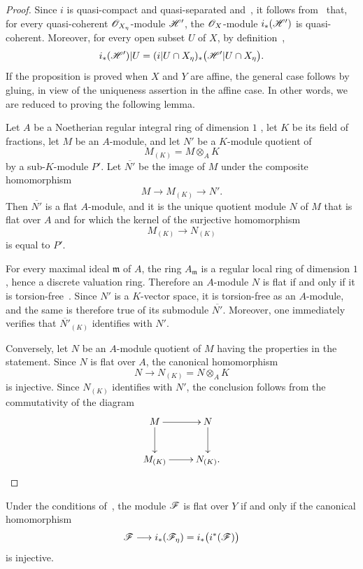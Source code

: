 \begin{proof}
Since $i$ is quasi-compact and quasi-separated
 and~, it follows
from~ that, for every quasi-coherent
$\mathscr{O}_{X_\eta}$-module $\mathscr{H}'$, the $\mathscr{O}_X$-module
$i_*(\mathscr{H}')$ is quasi-coherent. Moreover, for every open subset
$U$ of $X$, by definition~,
\[
  i_*(\mathscr{H}')|U
    =
  (i|U\cap X_\eta)_*
    \bigl(\mathscr{H}'|U\cap X_\eta\bigr).
\]
If the proposition is proved when $X$ and $Y$ are affine, the general
case follows by gluing, in view of the uniqueness assertion in the
affine case. In other words, we are reduced to proving the following
lemma.

\begin{lemma}[2.8.1.1]
\label{IV.2.8.1.1}
Let $A$ be a Noetherian regular integral ring of dimension $1$
, let $K$ be its field of fractions, let $M$ be an
$A$-module, and let $N'$ be a $K$-module quotient of
\[
  M_{(K)}=M\otimes_A K
\]
by a sub-$K$-module $P'$. Let $\overline{N'}$ be the image of $M$
under the composite homomorphism
\[
  M\longrightarrow M_{(K)}\longrightarrow N'.
\]
Then $\overline{N'}$ is a flat $A$-module, and it is the unique
quotient module $N$ of $M$ that is flat over $A$ and for which the
kernel of the surjective homomorphism
\[
  M_{(K)}\longrightarrow N_{(K)}
\]
is equal to $P'$.
\end{lemma}

For every maximal ideal $\mathfrak{m}$ of $A$, the ring
$A_\mathfrak{m}$ is a regular local ring of dimension $1$, hence a
discrete valuation ring. Therefore an $A$-module $N$ is flat if and
only if it is torsion-free~. Since $N'$ is a
$K$-vector space, it is torsion-free as an $A$-module, and the same is
therefore true of its submodule $\overline{N'}$. Moreover, one
immediately verifies that $\overline{N'}_{(K)}$ identifies with $N'$.

Conversely, let $N$ be an $A$-module quotient of $M$ having the
properties in the statement. Since $N$ is flat over $A$, the
canonical homomorphism
\[
  N\longrightarrow N_{(K)}=N\otimes_A K
\]
is injective. Since $N_{(K)}$ identifies with $N'$, the conclusion
follows from the commutativity of the diagram
\[
\xymatrix{
  M \ar[r] \ar[d] & N \ar[d] \\
  M_{(K)} \ar[r] & N_{(K)}.
}
\]
\end{proof}

\begin{corollary}[2.8.2]
\label{IV.2.8.2}
Under the conditions of~, the module $\mathscr{F}$ is flat
over $Y$ if and only if the canonical homomorphism
\[
  \mathscr{F}\longrightarrow i_*(\mathscr{F}_\eta)
    =i_*\bigl(i^*(\mathscr{F})\bigr)
\]
is injective.
\end{corollary}

